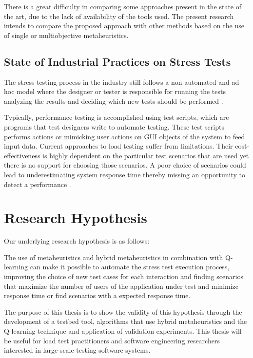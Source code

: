 \documentclass{report}
\begin{document}
There is a great difficulty in
comparing some approaches present in the state of
the art, due to the lack of availability of the tools used. The present
research intends to compare the proposed approach with other methods
based on the use of single or multiobjective metaheuristics.
 

\subsection{State of Industrial Practices on Stress Tests}

The stress testing process in the industry still follows a non-automated and ad-hoc model where the designer or tester is responsible for running the tests analyzing the results and deciding which new tests should be performed \cite{Lewis2005}. 

Typically, performance testing is accomplished using test scripts, which are programs that test designers write to automate testing. These test scripts performs actions or mimicking user actions on GUI objects of the system to feed input data. Current approaches to load testing suffer from limitations. Their cost-effectiveness is highly dependent on the particular test scenarios that are used yet there is no support for choosing those scenarios. A poor choice of scenarios could lead to underestimating system response time thereby missing an opportunity to detect a performance \cite{Grechanik2012}.




\section{Research Hypothesis}


Our underlying research hypothesis is as follows:

\begin{mdframed}[roundcorner=10pt]
The use of metaheuristics and hybrid metaheuristics in combination with Q-learning can make it possible to automate the stress test execution process, improving the choice of new test cases for each interaction and finding scenarios that maximize the number of users of the application under test and minimize response time or find scenarios with a expected response time.
\end{mdframed}

The purpose of this thesis is to show the validity of this hypothesis through the development of a testbed tool, algorithms that use hybrid metaheuristics and the Q-learning technique and application of validation experiments. This thesis will be useful for load test practitioners and software engineering researchers interested in large-scale testing software systems.
\end{document}
